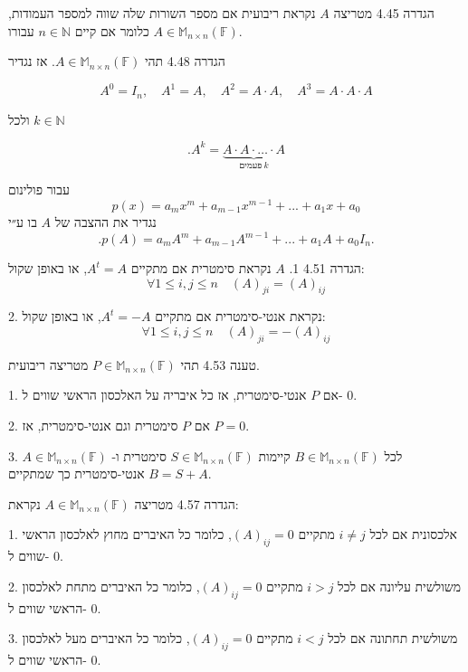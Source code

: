 \documentclass[a4paper, 11pt]{article}
\begin{document}
\begin{envbox}[defcolor]{הגדרה 4.45}
מטריצה $A$ נקראת ריבועית אם מספר השורות שלה שווה למספר העמודות, כלומר אם קיים $n\in\mathbb{N}$ עבורו $A\in\mathbb{M}_{n\times n}(\mathbb{F})$.
\end{envbox}

\begin{envbox}[defcolor]{הגדרה 4.48}
תהי $A\in\mathbb{M}_{n\times n}(\mathbb{F})$. אז נגדיר

\[
A^0=I_n, \quad A^1=A, \quad A^2=A\cdot A, \quad A^3=A\cdot A\cdot A
\]

ולכל $k\in\mathbb{N}$

\[
.A^k = \underbrace{A \cdot A \cdot \ldots \cdot A}_{\text{פעמים} \ k}
\]

עבור פולינום 
\[
p(x)=a_mx^m+a_{m-1}x^{m-1}+...+a_1x+a_0
\]
 נגדיר את ההצבה של $A$ בו ע״י 
\[
.p(A)=a_mA^m+a_{m-1}A^{m-1}+...+a_1A+a_0I_n.
\]
\end{envbox}

\begin{envbox}[defcolor]{הגדרה 4.51}
1.  $A$ נקראת סימטרית אם מתקיים $A^t=A$, או באופן שקול: 
\[
\forall 1\leq i,j\leq n \quad (A)_{ji}=(A)_{ij}
\]

2.  נקראת אנטי-סימטרית אם מתקיים $A^t=-A$, או באופן שקול: 
\[
\forall 1\leq i,j\leq n \quad (A)_{ji}=-(A)_{ij}
\]
\end{envbox}

\begin{envbox}[thmcolor]{טענה 4.53}
תהי $P\in\mathbb{M}_{n\times n}(\mathbb{F})$ מטריצה ריבועית.

1.  אם $P$ אנטי-סימטרית, אז כל איבריה על האלכסון הראשי שווים ל- $0$.

2.  אם $P$ סימטרית וגם אנטי-סימטרית, אז $P=0$.

3.  לכל $B\in\mathbb{M}_{n\times n}(\mathbb{F})$ קיימות $S\in\mathbb{M}_{n\times n}(\mathbb{F})$ סימטרית ו- $A\in\mathbb{M}_{n\times n}(\mathbb{F})$ אנטי-סימטרית כך שמתקיים $B=S+A$.
\end{envbox}

\begin{envbox}[defcolor]{הגדרה 4.57}
מטריצה $A\in\mathbb{M}_{n\times n}(\mathbb{F})$ נקראת:

1.  אלכסונית אם לכל $i\neq j$ מתקיים $(A)_{ij}=0$, כלומר כל האיברים מחוץ לאלכסון הראשי שווים ל- $0$.

2.  משולשית עליונה אם לכל $i>j$ מתקיים $(A)_{ij}=0$, כלומר כל האיברים מתחת לאלכסון הראשי שווים ל- $0$.

3.  משולשית תחתונה אם לכל $i<j$ מתקיים $(A)_{ij}=0$, כלומר כל האיברים מעל לאלכסון הראשי שווים ל- $0$.
\end{envbox}
\end{document}
